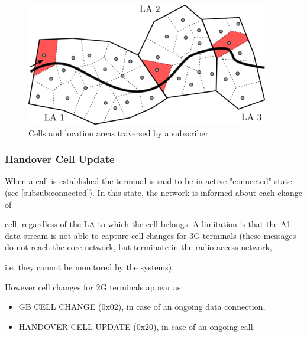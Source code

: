 \documentclass[master,english]{hgbthesis}
\begin{document}

\begin{figure}

	\centering

	\includegraphics[width=\linewidth]{./images/laupdate.png}

	\caption{Cells and location areas traversed by a subscriber} 

	\label{fig:latraversed}

\end{figure}

\subsubsection{Handover Cell Update}

When a call is established the terminal is said to be in active "connected" state (see \ref{subsub:connected}).  In this state, the network is informed about each change of

cell, regardless of the LA to which the cell belongs. A limitation is that the A1 data stream is not able to capture cell changes for 3G terminals (these messages do not reach the core network, but terminate in the radio access network,

i.e. they cannot be monitored by the systems).

However cell changes for 2G terminals appear as:

\begin{itemize}

	\item GB CELL CHANGE (0x02), in case of an ongoing data connection,

	\item HANDOVER CELL UPDATE (0x20), in case of an ongoing call.

\end{itemize}
\end{document}

